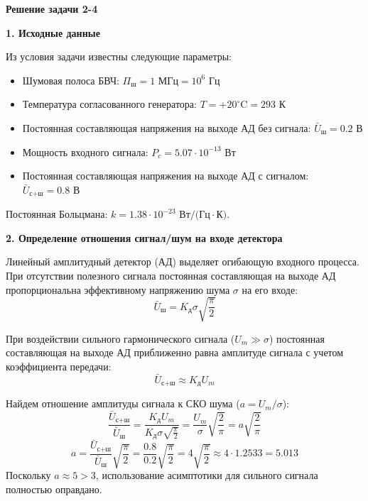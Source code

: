 \textbf{Решение задачи 2-4}

\vspace{1em}
\textbf{1. Исходные данные}

Из условия задачи известны следующие параметры:
\begin{itemize}
    \item Шумовая полоса БВЧ: $\Pi_{\text{ш}} = 1 \text{ МГц} = 10^6 \text{ Гц}$
    \item Температура согласованного генератора: $T = +20^\circ\text{C} = 293 \text{ К}$
    \item Постоянная составляющая напряжения на выходе АД без сигнала: $\bar{U}_{\text{ш}} = 0.2 \text{ В}$
    \item Мощность входного сигнала: $P_c = 5.07 \cdot 10^{-13} \text{ Вт}$
    \item Постоянная составляющая напряжения на выходе АД с сигналом: $\bar{U}_{\text{с+ш}} = 0.8 \text{ В}$
\end{itemize}
Постоянная Больцмана: $k = 1.38 \cdot 10^{-23} \text{ Вт/(Гц}\cdot\text{К)}$.

\vspace{1em}
\textbf{2. Определение отношения сигнал/шум на входе детектора}

Линейный амплитудный детектор (АД) выделяет огибающую входного процесса. При отсутствии полезного сигнала постоянная составляющая на выходе АД пропорциональна эффективному напряжению шума $\sigma$ на его входе:
\begin{equation*}
    \bar{U}_{\text{ш}} = K_{\text{д}} \sigma \sqrt{\frac{\pi}{2}}
\end{equation*}

При воздействии сильного гармонического сигнала ($U_m \gg \sigma$) постоянная составляющая на выходе АД приближенно равна амплитуде сигнала с учетом коэффициента передачи:
\begin{equation*}
    \bar{U}_{\text{с+ш}} \approx K_{\text{д}} U_m
\end{equation*}

Найдем отношение амплитуды сигнала к СКО шума ($a = U_m/\sigma$):
\begin{equation*}
    \frac{\bar{U}_{\text{с+ш}}}{\bar{U}_{\text{ш}}} = \frac{K_{\text{д}} U_m}{K_{\text{д}} \sigma \sqrt{\frac{\pi}{2}}} = \frac{U_m}{\sigma} \sqrt{\frac{2}{\pi}} = a \sqrt{\frac{2}{\pi}}
\end{equation*}
\begin{equation*}
    a = \frac{\bar{U}_{\text{с+ш}}}{\bar{U}_{\text{ш}}} \sqrt{\frac{\pi}{2}} = \frac{0.8}{0.2} \sqrt{\frac{\pi}{2}} = 4 \sqrt{\frac{\pi}{2}} \approx 4 \cdot 1.2533 = 5.013
\end{equation*}
Поскольку $a \approx 5 > 3$, использование асимптотики для сильного сигнала полностью оправдано.

